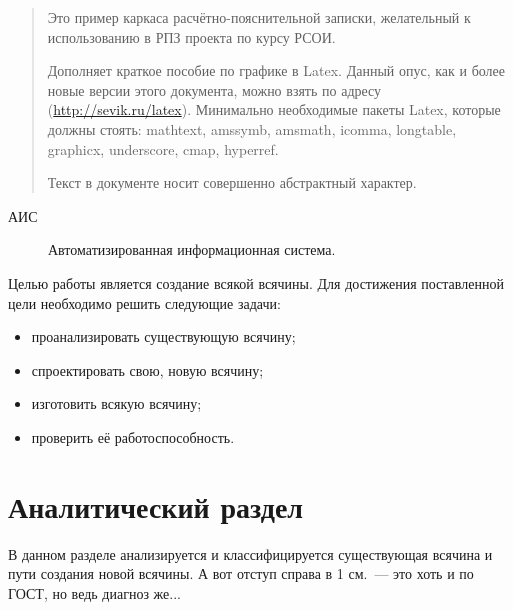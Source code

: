 \documentclass[utf8]{G7-32} %
\begin{document}
 

\frontmatter %

\begin{abstract}
Это пример каркаса расчётно-пояснительной записки, желательный к использованию в РПЗ проекта по курсу РСОИ.

Дополняет краткое пособие по графике в Latex.  Данный опус, как и более новые версии этого документа, можно взять по адресу (\url{http://sevik.ru/latex}). Минимально необходимые пакеты Latex, которые должны стоять: mathtext, amssymb, amsmath, icomma, longtable, graphicx, underscore, cmap, hyperref.

Текст в документе носит совершенно абстрактный характер.
\end{abstract}

\tableofcontents


\Abbreviations %
\begin{description}
\item[АИС] Автоматизированная информационная система.
\end{description}

\Introduction

Целью работы является создание всякой всячины. Для достижения поставленной цели необходимо решить следующие задачи:
%
\begin{itemize}
\item проанализировать существующую всячину;
\item спроектировать свою, новую всячину;
\item изготовить всякую всячину;
\item проверить её работоспособность.
\end{itemize}

\mainmatter %

\chapter{Аналитический раздел}
%
%
В данном разделе анализируется и классифицируется существующая всячина и пути создания новой всячины. А вот отступ справа в 1 см.~--- это хоть и по ГОСТ, но ведь диагноз же...
\end{document}
